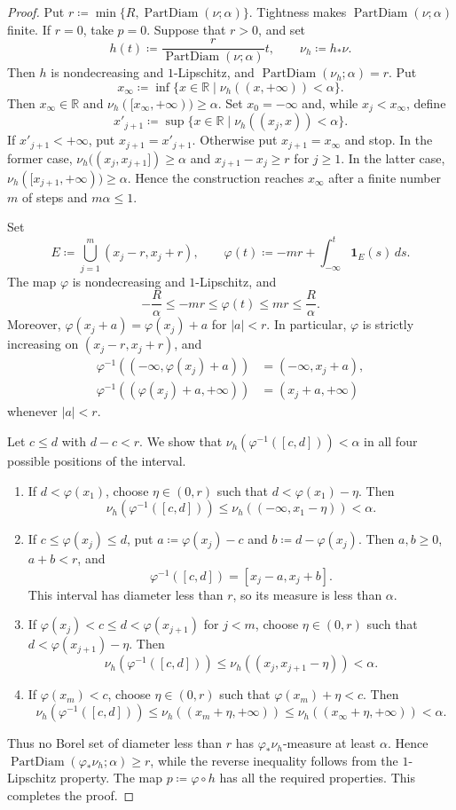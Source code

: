 \documentclass{amsart}
\theoremstyle{plain}
\theoremstyle{definition}
\theoremstyle{remark}
\newcommand{\R}{\mathbb{R}}
\DeclareMathOperator{\pd}{PartDiam}
\begin{document}
\begin{proof}
Put $r\coloneqq\min\{R,\pd(\nu;\alpha)\}$.  Tightness makes
$\pd(\nu;\alpha)$ finite.  If $r=0$, take $p=0$.  Suppose that $r>0$, and
set
\[
h(t)\coloneqq\frac{r}{\pd(\nu;\alpha)}t,\qquad \nu_h\coloneqq h_*\nu.
\]
Then $h$ is nondecreasing and $1$-Lipschitz, and
$\pd(\nu_h;\alpha)=r$.  Put
\[ x_\infty\coloneqq \inf\{x\in\R\mid\nu_h((x,+\infty))<\alpha\}. \]
Then $x_\infty\in\R$ and
$\nu_h([x_\infty,+\infty))\geq\alpha$.  Set $x_0=-\infty$ and, while
$x_j<x_\infty$, define
\[ x'_{j+1}\coloneqq \sup\{x\in\R\mid\nu_h((x_j,x))<\alpha\}. \]
If $x'_{j+1}<+\infty$, put $x_{j+1}=x'_{j+1}$.  Otherwise put
$x_{j+1}=x_\infty$ and stop.  In the former case,
$\nu_h((x_j,x_{j+1}])\geq\alpha$ and $x_{j+1}-x_j\geq r$ for $j\geq1$.
In the latter case,
$\nu_h([x_{j+1},+\infty))\geq\alpha$.  Hence the construction reaches
$x_\infty$ after a finite number $m$ of steps and $m\alpha\leq1$.

Set
\[
E\coloneqq\bigcup_{j=1}^m(x_j-r,x_j+r),\qquad
\varphi(t)\coloneqq-mr+\int_{-\infty}^t\boldsymbol 1_E(s)\,ds.
\]
The map $\varphi$ is nondecreasing and $1$-Lipschitz, and
\[
-\frac R\alpha\leq-mr\leq\varphi(t)\leq mr\leq\frac R\alpha.
\]
Moreover, $\varphi(x_j+a)=\varphi(x_j)+a$ for $|a|<r$.
In particular, $\varphi$ is strictly increasing on
$(x_j-r,x_j+r)$, and
\begin{align*}
\varphi^{-1}((-\infty,\varphi(x_j)+a))&=(-\infty,x_j+a),\\
\varphi^{-1}((\varphi(x_j)+a,+\infty))&=(x_j+a,+\infty)
\end{align*}
whenever $|a|<r$.

Let $c\leq d$ with $d-c<r$.  We show that
$\nu_h(\varphi^{-1}([c,d]))<\alpha$ in all four possible positions of the
interval.
\begin{enumerate}[label=\textup{(\roman*)}]
\item If $d<\varphi(x_1)$, choose $\eta\in(0,r)$ such that
$d<\varphi(x_1)-\eta$.  Then
\[ \nu_h(\varphi^{-1}([c,d])) \leq\nu_h((-\infty,x_1-\eta))<\alpha. \]
\item If $c\leq\varphi(x_j)\leq d$, put
$a\coloneqq\varphi(x_j)-c$ and $b\coloneqq d-\varphi(x_j)$.  Then
$a,b\geq0$, $a+b<r$, and
\[
\varphi^{-1}([c,d])=[x_j-a,x_j+b].
\]
This interval has diameter less than $r$, so its measure is less than
$\alpha$.
\item If $\varphi(x_j)<c\leq d<\varphi(x_{j+1})$ for $j<m$, choose
$\eta\in(0,r)$ such that $d<\varphi(x_{j+1})-\eta$.  Then
\[ \nu_h(\varphi^{-1}([c,d])) \leq\nu_h((x_j,x_{j+1}-\eta))<\alpha. \]
\item If $\varphi(x_m)<c$, choose $\eta\in(0,r)$ such that
$\varphi(x_m)+\eta<c$.  Then
\[
\nu_h(\varphi^{-1}([c,d]))
\leq\nu_h((x_m+\eta,+\infty))
\leq\nu_h((x_\infty+\eta,+\infty))<\alpha.
\]
\end{enumerate}
Thus no Borel set of diameter less than $r$ has
$\varphi_*\nu_h$-measure at least $\alpha$.
Hence $\pd(\varphi_*\nu_h;\alpha)\geq r$, while the reverse inequality
follows from the $1$-Lipschitz property.  The map $p\coloneqq\varphi\circ h$
has all the required properties.  This completes the proof.
\end{proof}
\end{document}
